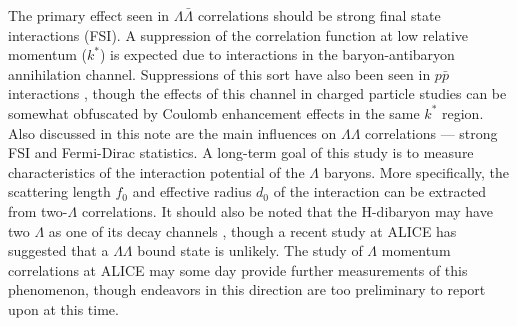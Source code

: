 The primary effect seen in $\Lambda\bar{\Lambda}$ correlations should be strong final state interactions (FSI).  
A suppression of the correlation function at low relative momentum ($k^*$) is expected due to interactions in the baryon-antibaryon annihilation channel.  
Suppressions of this sort have also been seen in $p \bar{p}$ interactions \cite{Gos:2007cj}, though the effects of this channel in charged particle studies can be somewhat obfuscated by Coulomb enhancement effects in the same $k^*$ region.  
Also discussed in this note are the main influences on $\Lambda\Lambda$ correlations --- strong FSI and Fermi-Dirac statistics.  
A long-term goal of this study is to measure characteristics of the interaction potential of the $\Lambda$ baryons.  
More specifically, the scattering length $f_0$ and effective radius $d_0$ of the interaction can be extracted from two-$\Lambda$ correlations. 
It should also be noted that the H-dibaryon may have two $\Lambda$ as one of its decay channels \cite{PhysRevLett.38.195}, though a recent study at ALICE has suggested that a $\Lambda\Lambda$ bound state is unlikely.  
The study of $\Lambda$ momentum correlations at ALICE may some day provide further measurements of this phenomenon, though endeavors in this direction are too preliminary to report upon at this time.


